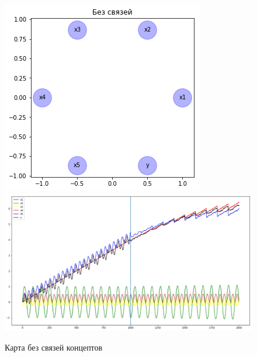 \def\figurename{Рис}
\begin{figure}
	\centering
	\includegraphics[width=0.7\columnwidth]{./img/lstmfcm_empty.png}
	\includegraphics[width=0.9\columnwidth]{./img/lstmfcm_empty_prediction.png}
	\caption{Карта без связей концептов}
	\label{pic:lstmfcm_empty}
\end{figure}

